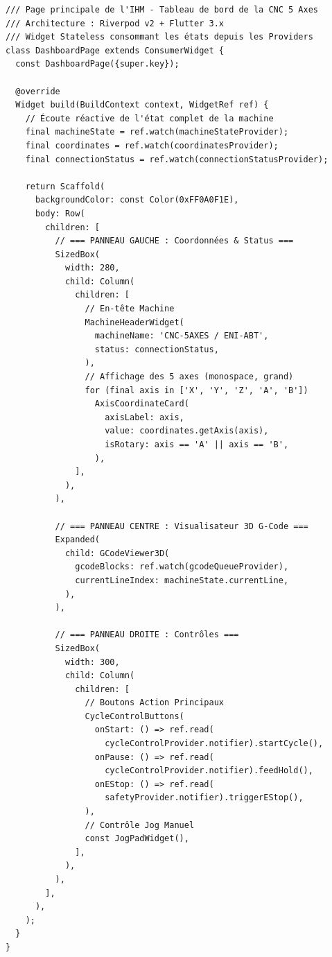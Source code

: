 \begin{tcolorbox}[colback=gray!5, colframe=macouleur, title=\texttt{dashboard\_page.dart} -- Écran principal IHM Flutter]
\begin{verbatim}
/// Page principale de l'IHM - Tableau de bord de la CNC 5 Axes
/// Architecture : Riverpod v2 + Flutter 3.x
/// Widget Stateless consommant les états depuis les Providers
class DashboardPage extends ConsumerWidget {
  const DashboardPage({super.key});

  @override
  Widget build(BuildContext context, WidgetRef ref) {
    // Écoute réactive de l'état complet de la machine
    final machineState = ref.watch(machineStateProvider);
    final coordinates = ref.watch(coordinatesProvider);
    final connectionStatus = ref.watch(connectionStatusProvider);

    return Scaffold(
      backgroundColor: const Color(0xFF0A0F1E),
      body: Row(
        children: [
          // === PANNEAU GAUCHE : Coordonnées & Status ===
          SizedBox(
            width: 280,
            child: Column(
              children: [
                // En-tête Machine
                MachineHeaderWidget(
                  machineName: 'CNC-5AXES / ENI-ABT',
                  status: connectionStatus,
                ),
                // Affichage des 5 axes (monospace, grand)
                for (final axis in ['X', 'Y', 'Z', 'A', 'B'])
                  AxisCoordinateCard(
                    axisLabel: axis,
                    value: coordinates.getAxis(axis),
                    isRotary: axis == 'A' || axis == 'B',
                  ),
              ],
            ),
          ),
          
          // === PANNEAU CENTRE : Visualisateur 3D G-Code ===
          Expanded(
            child: GCodeViewer3D(
              gcodeBlocks: ref.watch(gcodeQueueProvider),
              currentLineIndex: machineState.currentLine,
            ),
          ),
          
          // === PANNEAU DROITE : Contrôles ===
          SizedBox(
            width: 300,
            child: Column(
              children: [
                // Boutons Action Principaux
                CycleControlButtons(
                  onStart: () => ref.read(
                    cycleControlProvider.notifier).startCycle(),
                  onPause: () => ref.read(
                    cycleControlProvider.notifier).feedHold(),
                  onEStop: () => ref.read(
                    safetyProvider.notifier).triggerEStop(),
                ),
                // Contrôle Jog Manuel
                const JogPadWidget(),
              ],
            ),
          ),
        ],
      ),
    );
  }
}
\end{verbatim}
\end{tcolorbox}

